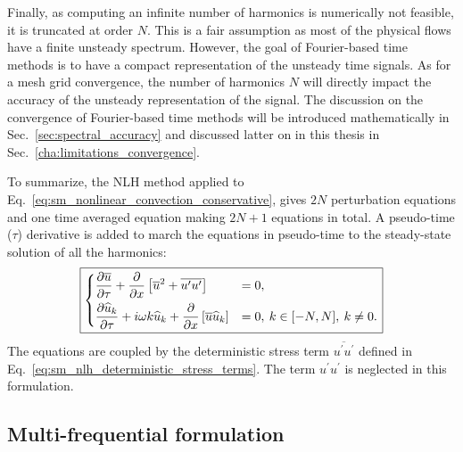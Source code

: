 Finally, as computing an infinite number of harmonics is 
numerically not feasible,
it is truncated at order $N$. 
This is a fair assumption as most
of the physical flows have a finite unsteady spectrum.
However, the goal of Fourier-based time
methods is to have a compact representation of the unsteady time
signals.
As for a mesh grid convergence, the number of harmonics $N$
will directly impact the accuracy of the unsteady representation
of the signal.
The discussion on the
convergence of Fourier-based time methods will be introduced mathematically
in Sec.~\ref{sec:spectral_accuracy} and discussed latter on in this 
thesis in Sec.~\ref{cha:limitations_convergence}.

To summarize, the NLH
method applied to Eq.~\eqref{eq:sm_nonlinear_convection_conservative},
gives $2N$ perturbation equations and one time
averaged equation making $2N+1$ equations in total. 
A pseudo-time ($\tau$) derivative is
added to march the equations in pseudo-time to the steady-state 
solution of all the harmonics:
\begin{equation}
	\fbox{$
	\begin{dcases}
		\frac{\partial \overline{u}}{\partial \tau} + 
		\frac{\partial}{\partial x}
			\left[\overline{u}^2 + 
			\overline{u^\prime u^\prime}\right] &=
			0, \\
		\frac{\partial \widehat{u}_k}{\partial \tau} + 
		i \omega k \widehat{u}_k + 
			\frac{\partial}{\partial x} 
			\left[ \overline{u} \widehat{u}_k\right] &= 
			0, \: k \in [-N, N], \: k \neq 0.
	\end{dcases}
	$}
	\label{eq:sm_nlh_subset_eq}
\end{equation}
The equations are coupled by the deterministic 
stress term $\overline{u^\prime u^\prime}$
defined in Eq.~\eqref{eq:sm_nlh_deterministic_stress_terms}.
The term $u^\prime u^\prime$ is neglected in this formulation.

\subsection{Multi-frequential formulation}

